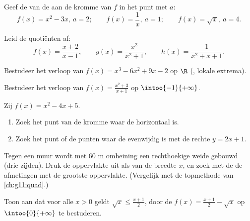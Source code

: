 \begin{exercise}[$\star$]\label{exo:g11:deriv:3}
Geef de  van de  aan de kromme van $f$ in het punt met
 $a$:
\[
f(x) = x^2 - 3x, \ a = 2; \qquad
f(x) = \frac1x, \ a = 1; \qquad
f(x) = \sqrt x, \ a = 4 .
\]
\end{exercise}

\begin{exercise}[$\star$]\label{exo:g11:deriv:4}
Leid de quotiënten af:
\[
f(x) = \frac{x+2}{x-1}, \qquad
g(x) = \frac{x^2}{x^2+1}, \qquad
h(x) = \frac{1}{x^2 + x + 1} .
\]
\end{exercise}

\begin{exercise}[$\star\star$]\label{exo:g11:deriv:5}
Bestudeer het verloop van $f(x) = x^3 - 6x^2 + 9x - 2$ op $\R$
(, lokale extrema).
\end{exercise}

\begin{exercise}[$\star\star$]\label{exo:g11:deriv:6}
Bestudeer het verloop van $f(x) = \frac{x^2 + 3}{x + 1}$ op
$\intoo{-1}{+\infty}$.
\end{exercise}

\begin{exercise}[$\star\star$]\label{exo:g11:deriv:7}
Zij $f(x) = x^2 - 4x + 5$.
\begin{enumerate}
  \item Zoek het punt van de kromme waar de  horizontaal is.
  \item Zoek het punt of de punten waar de  evenwijdig is met de
        rechte $y = 2x + 1$.
\end{enumerate}
\end{exercise}

\begin{exercise}[$\star\star$]\label{exo:g11:deriv:8}
Tegen een muur wordt met $60$ m omheining een rechthoekige weide gebouwd
(drie zijden). Druk de oppervlakte uit als  van de breedte $x$, en
zoek met de  de afmetingen met de grootste oppervlakte. (Vergelijk
met de topmethode van \cref{ch:g11:quad}.)
\end{exercise}

\begin{exercise}[$\star\star$]\label{exo:g11:deriv:9}
Toon aan dat voor alle $x > 0$ geldt $\sqrt{x} \leq \frac{x + 1}{2}$, door
de  $f(x) = \frac{x+1}{2} - \sqrt x$ op $\intoo{0}{+\infty}$ te
bestuderen.
\end{exercise}

